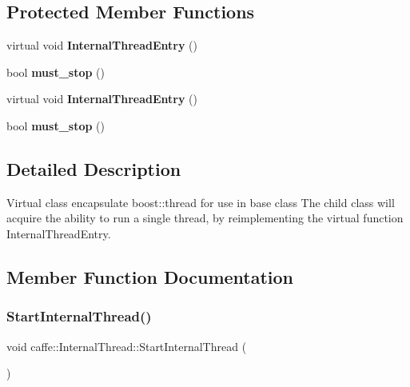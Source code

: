 \subsection*{Protected Member Functions}
\begin{DoxyCompactItemize}
\item 
\mbox{\label{classcaffe_1_1_internal_thread_a40b9506bc2985fdc189cff4fa680880b}} 
virtual void {\bfseries Internal\+Thread\+Entry} ()
\item 
\mbox{\label{classcaffe_1_1_internal_thread_a16fd45781962d8f59556b9323f11a397}} 
bool {\bfseries must\+\_\+stop} ()
\item 
\mbox{\label{classcaffe_1_1_internal_thread_a40b9506bc2985fdc189cff4fa680880b}} 
virtual void {\bfseries Internal\+Thread\+Entry} ()
\item 
\mbox{\label{classcaffe_1_1_internal_thread_a16fd45781962d8f59556b9323f11a397}} 
bool {\bfseries must\+\_\+stop} ()
\end{DoxyCompactItemize}


\subsection{Detailed Description}
Virtual class encapsulate boost\+::thread for use in base class The child class will acquire the ability to run a single thread, by reimplementing the virtual function Internal\+Thread\+Entry. 

\subsection{Member Function Documentation}
\mbox{\label{classcaffe_1_1_internal_thread_acffc1d9bc9e78f4146ba2d16f593fca7}} 
\subsubsection{\texorpdfstring{Start\+Internal\+Thread()}{StartInternalThread()}\hspace{0.1cm}{\footnotesize\ttfamily [1/2]}}
{\footnotesize\ttfamily void caffe\+::\+Internal\+Thread\+::\+Start\+Internal\+Thread (\begin{DoxyParamCaption}{ }\end{DoxyParamCaption})}


